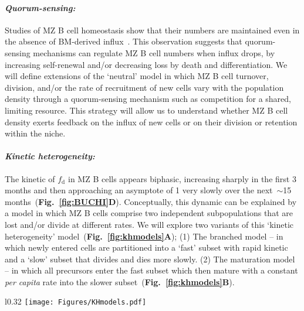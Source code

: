 \documentclass[11pt]{article}
\newcommand{\para}[1]{\vspace*{-4.5mm}\paragraph{#1}}
\begin{document}
\para{\textit{Quorum-sensing:}}
Studies of MZ B cell homeostasis show that their numbers are maintained even in the absence of BM-derived influx~\cite{Hao_2001, Carvalho_2001}.
This observation suggests that quorum-sensing mechanisms can regulate MZ B cell numbers when influx drops, by increasing self-renewal and/or decreasing  loss by death and differentiation. 
We will define extensions of the `neutral' model in which MZ B cell turnover, division, and/or the rate of recruitment of new cells vary with the population density through a quorum-sensing mechanism such as competition for a shared, limiting resource.
This strategy will allow us to understand whether MZ B cell density %
exerts feedback on the influx of new cells or on their division or retention within the niche.


\para{\textit{Kinetic heterogeneity:}}
The kinetic of $f_\text{d}$ in MZ B cells appears biphasic, increasing  sharply in the first 3 months and then approaching an asymptote of 1 very slowly over the next~$\sim$15 months~(\textbf{Fig.~\ref{fig:BUCHI}D}).
Conceptually, this dynamic can be explained by a model in which MZ B cells comprise two independent subpopulations that are lost and/or divide at different rates. 
We will explore two variants of this `kinetic heterogeneity' model~(\textbf{Fig.~\ref{fig:khmodels}A});
(1) The branched model --  in which newly entered cells are partitioned into a `fast' subset with rapid kinetic and a `slow' subset that divides and dies more slowly.
(2) The maturation model --  in which all precursors enter the fast subset which then mature with a constant \textit{per capita} rate into the slower subset~(\textbf{Fig.~\ref{fig:khmodels}B}).


\begin{wrapfigure}{l}{0.32\textwidth}
\centering
\vspace*{2mm}
\texttt{[image: Figures/KHmodels.pdf]}
\vspace*{-5mm}
\caption{{Models assuming kinetic heterogeneity in the MZ B cell compartment.}}%
\label{fig:khmodels}
\vspace*{-4mm}
\end{wrapfigure}
\end{document}
